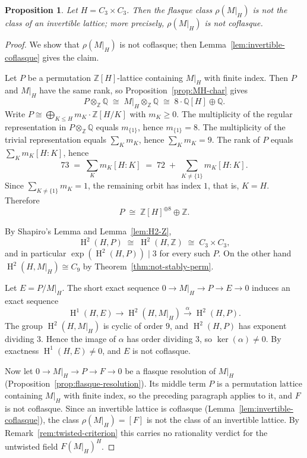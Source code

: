 \documentclass[12pt,a4paper]{article}
\newtheorem{proposition}[theorem]{Proposition}
\theoremstyle{definition}
\DeclareMathOperator{\coh}{H}
\begin{document}
\begin{proposition}\label{prop:rho-not-invertible}
Let \(H = C_3 \times C_3\).  Then the flasque class \(\rho(M|_H)\) is
not the class of an invertible lattice; more precisely, \(\rho(M|_H)\)
is not coflasque.
\end{proposition}
\begin{proof}
We show that \(\rho(M|_H)\) is not coflasque; then
Lemma~\ref{lem:invertible-coflasque} gives the claim.

Let \(P\) be a permutation \(\mathbb{Z}[H]\)-lattice containing
\(M|_H\) with finite index.  Then \(P\) and \(M|_H\) have the same
rank, so Proposition~\ref{prop:MH-char} gives
\[
P \otimes_{\mathbb{Z}} \mathbb{Q}
\;\cong\; M|_H \otimes_{\mathbb{Z}} \mathbb{Q}
\;\cong\; 8 \cdot \mathbb{Q}[H] \oplus \mathbb{Q}.
\]
Write \(P \cong \bigoplus_{K \le H} m_K \cdot \mathbb{Z}[H/K]\) with
\(m_K \ge 0\).  The multiplicity of the regular representation in
\(P \otimes_{\mathbb{Z}} \mathbb{Q}\) equals \(m_{\{1\}}\), hence
\(m_{\{1\}} = 8\).  The multiplicity of the trivial representation
equals \(\sum_{K} m_K\), hence \(\sum_{K} m_K = 9\).  The rank of \(P\)
equals \(\sum_{K} m_K [H:K]\), hence
\[
73 \;=\; \sum_{K} m_K [H:K]
\;=\; 72 \;+\; \sum_{K \neq \{1\}} m_K [H:K].
\]
Since \(\sum_{K \neq \{1\}} m_K = 1\), the remaining orbit has index
\(1\), that is, \(K = H\).  Therefore
\[
P \;\cong\; \mathbb{Z}[H]^{\oplus 8} \oplus \mathbb{Z}.
\]

By Shapiro's Lemma and Lemma~\ref{lem:H2-Z},
\[
\coh^2(H, P) \;\cong\; \coh^2(H, \mathbb{Z})
\;\cong\; C_3 \times C_3 ,
\]
and in particular \(\exp(\coh^2(H, P)) \mid 3\) for every such \(P\).
On the other hand \(\coh^2(H, M|_H) \cong C_9\) by
Theorem~\ref{thm:not-stably-perm}.

Let \(E = P / M|_H\).  The short exact sequence
\(0 \to M|_H \to P \to E \to 0\) induces an exact sequence
\[
\coh^1(H, E) \longrightarrow \coh^2(H, M|_H)
\xrightarrow{\ \alpha\ } \coh^2(H, P).
\]
The group \(\coh^2(H, M|_H)\) is cyclic of order \(9\), and
\(\coh^2(H, P)\) has exponent dividing \(3\).  Hence the image of
\(\alpha\) has order dividing \(3\), so \(\ker(\alpha) \neq 0\).  By
exactness \(\coh^1(H, E) \neq 0\), and \(E\) is not coflasque.

Now let \(0 \to M|_H \to P \to F \to 0\) be a flasque resolution of
\(M|_H\) (Proposition~\ref{prop:flasque-resolution}).  Its middle term
\(P\) is a permutation lattice containing \(M|_H\) with finite index,
so the preceding paragraph applies to it, and \(F\) is not coflasque.
Since an invertible lattice is coflasque
(Lemma~\ref{lem:invertible-coflasque}), the class
\(\rho(M|_H) = [F]\) is not the class of an invertible lattice.  By
Remark~\ref{rem:twisted-criterion} this carries no rationality verdict
for the untwisted field \(F(M|_H)^H\).
\end{proof}
\end{document}
